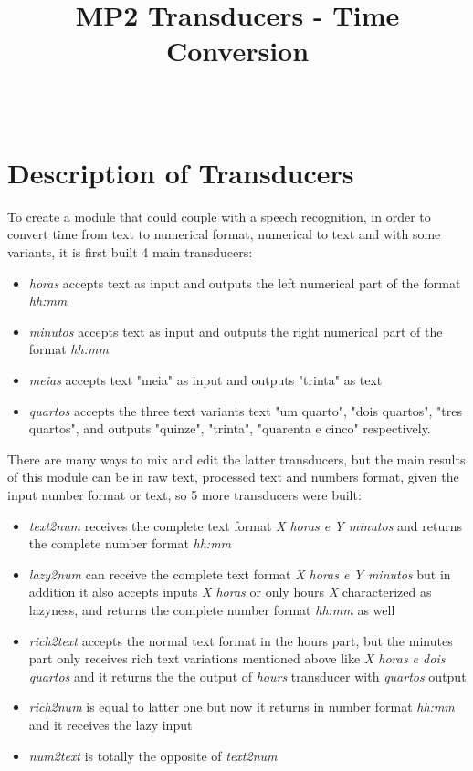 \documentclass{sigchi}
\def\plaintitle{MP2 Transducers - Time Conversion}
\begin{document}
\title{\plaintitle}

\author{%
  \\
}

\maketitle


\section{Description of Transducers}

To create a module that could couple with a speech recognition, in order to convert time from text to numerical format, numerical to text and with some variants, it is first built 4 main transducers: 

\begin{itemize}
    \item \emph{horas} accepts text as input and outputs the left numerical part of the format \emph{hh:mm}
    \item \emph{minutos} accepts text as input and outputs the right numerical part of the format \emph{hh:mm}
    \item \emph{meias} accepts text "meia" as input and outputs "trinta" as text 
    \item \emph{quartos} accepts the three text variants text "um quarto", "dois quartos", "tres quartos", and outputs "quinze", "trinta", "quarenta e cinco" respectively.
\end{itemize}

There are many ways to mix and edit the latter transducers, but the main results of this module can be in raw text, processed text and numbers format, given the input number format or text, so 5 more transducers were built:

\begin{itemize}
    \item \emph{text2num} receives the complete text format \emph{X horas e Y minutos} and returns the complete number format \emph{hh:mm}
    \item \emph{lazy2num} can receive the complete text format \emph{X horas e Y minutos} but in addition it also accepts inputs \emph{X horas} or only hours \emph{X} characterized as lazyness, and returns the complete number format \emph{hh:mm} as well
    \item \emph{rich2text} accepts the normal text format in the hours part, but the minutes part only receives rich text variations mentioned above like  \emph{X horas e dois quartos} and it returns the the output of \emph{hours} transducer with \emph{quartos} output
    \item \emph{rich2num} is equal to latter one but now it returns in number format \emph{hh:mm} and it receives the lazy input
    \item \emph{num2text} is totally the opposite of \emph{text2num}
\end{itemize}
\end{document}
